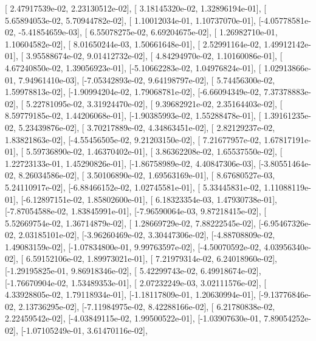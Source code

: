 \documentclass{article}
\begin{document}
       [ 2.47917539e-02,  2.23130512e-02],
       [ 3.18145320e-02,  1.32896194e-01],
       [ 5.65894053e-02,  5.70944782e-02],
       [ 1.10012034e-01,  1.10737070e-01],
       [-4.05778581e-02, -5.41854659e-03],
       [ 6.55078275e-02,  6.69204675e-02],
       [ 1.26982710e-01,  1.10604582e-02],
       [ 8.01650244e-03,  1.50661648e-01],
       [ 2.52991164e-02,  1.49912142e-01],
       [ 3.95588674e-02,  9.01412732e-02],
       [ 4.84294970e-02,  1.10160086e-01],
       [ 4.67240850e-02,  1.39056923e-01],
       [-5.10662283e-02,  1.04976824e-01],
       [ 1.02913866e-01,  7.94961410e-03],
       [-7.05342893e-02,  9.64198797e-02],
       [ 5.74456300e-02,  1.59978813e-02],
       [-1.90994204e-02,  1.79068781e-02],
       [-6.66094349e-02,  7.37378883e-02],
       [ 5.22781095e-02,  3.31924470e-02],
       [ 9.39682921e-02,  2.35164403e-02],
       [ 8.59779185e-02,  1.44206068e-01],
       [-1.90385993e-02,  1.55288478e-01],
       [ 1.39161235e-02,  5.23439876e-02],
       [ 3.70217889e-02,  4.34863451e-02],
       [ 2.82129237e-02,  1.83821863e-02],
       [-4.55456505e-02,  9.21203150e-02],
       [ 7.21677957e-02,  1.67817191e-01],
       [ 5.59736890e-02,  1.46370402e-01],
       [ 3.86362208e-02,  1.65537550e-02],
       [ 1.22723133e-01,  1.45290826e-01],
       [-1.86758989e-02,  4.40847306e-03],
       [-3.80551464e-02,  8.26034586e-02],
       [ 3.50106890e-02,  1.69563169e-01],
       [ 8.67680527e-03,  5.24110917e-02],
       [-6.88466152e-02,  1.02745581e-01],
       [ 5.33445831e-02,  1.11088119e-01],
       [-6.12897151e-02,  1.85802600e-01],
       [ 6.18323354e-03,  1.47930738e-01],
       [-7.87054588e-02,  1.83845991e-01],
       [-7.96590064e-03,  9.87218415e-02],
       [ 5.52669754e-02,  1.36714879e-02],
       [ 1.28669729e-02,  7.88222545e-02],
       [-6.95467326e-02,  2.03185101e-02],
       [-3.96260469e-02,  3.30447306e-02],
       [-4.88708809e-02,  1.49083159e-02],
       [-1.07834800e-01,  9.99763597e-02],
       [-4.50070592e-02,  4.03956340e-02],
       [ 6.59152106e-02,  1.89973021e-01],
       [ 7.21979314e-02,  6.24018960e-02],
       [-1.29195825e-01,  9.86918346e-02],
       [ 5.42299743e-02,  6.49918674e-02],
       [-1.76670904e-02,  1.53489353e-01],
       [ 2.07232249e-03,  3.02111576e-02],
       [ 4.33928805e-02,  1.79118934e-01],
       [-1.18117809e-01,  1.20630994e-01],
       [-9.13776846e-02,  2.13736295e-02],
       [-7.11984975e-02,  8.42288166e-02],
       [ 6.21780838e-02,  2.22459542e-02],
       [-4.03849115e-02,  1.99500522e-01],
       [-1.03907630e-01,  7.89054252e-02],
       [-1.07105249e-01,  3.61470116e-02],
\end{document}

